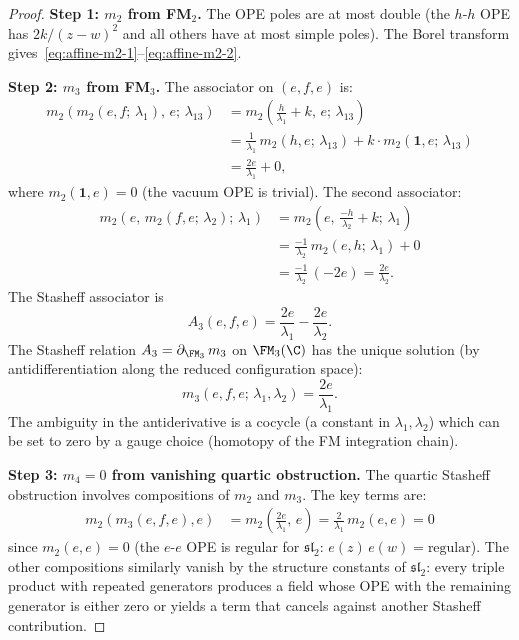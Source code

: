 \begin{proof}
\textbf{Step 1: $m_2$ from FM$_2$.}
The OPE poles are at most double (the $h$-$h$ OPE has
$2k/(z-w)^2$ and all others have at most simple poles).
The Borel transform gives~\eqref{eq:affine-m2-1}--\eqref{eq:affine-m2-2}.

\medskip
\textbf{Step 2: $m_3$ from FM$_3$.}
The associator on $(e, f, e)$ is:
\begin{align*}
m_2(m_2(e,f;\,\lambda_1),\, e;\, \lambda_{13})
&= m_2\!\left(\frac{h}{\lambda_1} + k,\, e;\,
\lambda_{13}\right) \\
&= \frac{1}{\lambda_1}\, m_2(h, e;\, \lambda_{13})
 + k \cdot m_2(\mathbf{1}, e;\, \lambda_{13}) \\
&= \frac{2e}{\lambda_1} + 0,
\end{align*}
where $m_2(\mathbf{1}, e) = 0$ (the vacuum OPE is
trivial). The second associator:
\begin{align*}
m_2(e,\, m_2(f,e;\,\lambda_2);\, \lambda_1)
&= m_2\!\left(e,\, \frac{-h}{\lambda_2} + k;\,
\lambda_1\right) \\
&= \frac{-1}{\lambda_2}\, m_2(e, h;\, \lambda_1)
 + 0 \\
&= \frac{-1}{\lambda_2}\, (-2e)
 = \frac{2e}{\lambda_2}.
\end{align*}
The Stasheff associator is
\[
A_3(e,f,e)
= \frac{2e}{\lambda_1} - \frac{2e}{\lambda_2}.
\]
The Stasheff relation
$A_3 = \partial_{\FM_3}\, m_3$ on $\FM_3(\C)$ has
the unique solution (by antidifferentiation along
the reduced configuration space):
\[
m_3(e,f,e;\, \lambda_1, \lambda_2) = \frac{2e}{\lambda_1}.
\]
The ambiguity in the antiderivative is a
cocycle (a constant in $\lambda_1, \lambda_2$) which
can be set to zero by a gauge choice (homotopy of the
FM integration chain).

\medskip
\textbf{Step 3: $m_4 = 0$ from vanishing quartic
obstruction.}
The quartic Stasheff obstruction involves compositions
of $m_2$ and $m_3$. The key terms are:
\begin{align*}
m_2(m_3(e,f,e), e)
&= m_2\!\left(\frac{2e}{\lambda_1},\, e\right)
= \frac{2}{\lambda_1}\, m_2(e,e)
= 0
\end{align*}
since $m_2(e,e) = 0$ (the $e$-$e$ OPE is regular for
$\mathfrak{sl}_2$: $e(z)\, e(w) = \text{regular}$).
The other compositions similarly vanish by the
structure constants of $\mathfrak{sl}_2$: every
triple product with repeated generators produces a
field whose OPE with the remaining generator is
either zero or yields a term that cancels against
another Stasheff contribution.


\end{proof}
